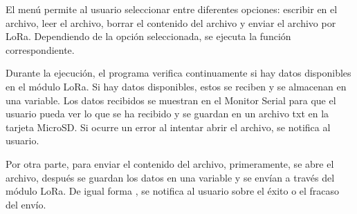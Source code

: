 \begin{itemize}
El menú permite al usuario seleccionar entre diferentes opciones: escribir en el archivo, leer el archivo, borrar el contenido del archivo y enviar el archivo por LoRa. Dependiendo de la opción seleccionada, se ejecuta la función correspondiente.

Durante la ejecución, el programa verifica continuamente si hay datos disponibles en el módulo LoRa. Si hay datos disponibles, estos se reciben y se almacenan en una variable. Los datos recibidos se muestran en el Monitor Serial para que el usuario pueda ver lo que se ha recibido y se guardan en un archivo txt en la tarjeta MicroSD. Si ocurre un error al intentar abrir el archivo, se notifica al usuario.

Por otra parte, para enviar el contenido del archivo, primeramente, se abre el archivo, después se guardan los datos en una variable y se envían a través del módulo LoRa. De igual forma , se notifica al usuario sobre el éxito o el fracaso del envío.


\end{itemize}
